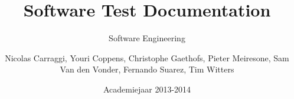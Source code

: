 \author{Nicolas Carraggi, Youri Coppens, Christophe Gaethofs, Pieter Meiresone, Sam Van den Vonder, Fernando Suarez, Tim Witters}
\title{Software Test Documentation}
\subtitle{Software Engineering} 
\date{Academiejaar 2013-2014}

\makeassignment

